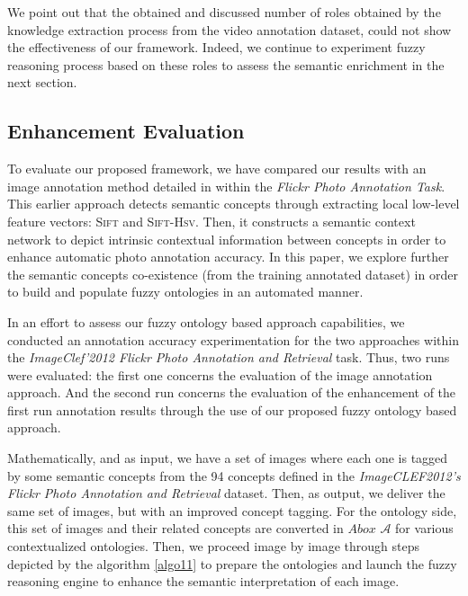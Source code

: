 		We point out that the obtained and discussed number of roles obtained by the knowledge
		extraction process from the video annotation dataset, could not show the effectiveness of our 
		framework. Indeed, we continue to experiment fuzzy reasoning process based 
		on these roles to assess the semantic enrichment in the next section.

		\subsection{Enhancement Evaluation}
		To evaluate our proposed framework, we have compared our results with an image annotation 
		method detailed in \cite{Ksibi2012} within the \emph{Flickr Photo Annotation Task}. 
		This earlier approach detects semantic concepts through extracting
		local low-level feature vectors: \textsc{Sift} and \textsc{Sift-Hsv}.
		Then, it constructs a semantic context network to depict intrinsic 
		contextual information between concepts in order to enhance automatic 
		photo annotation accuracy. In this paper, we explore further the semantic concepts 
		co-existence (from the training annotated dataset) in order to build and populate 
		fuzzy ontologies in an automated manner.
		
		In an effort to assess our fuzzy ontology based approach capabilities, 
		we conducted an annotation accuracy experimentation for the
		two approaches within the \emph{ImageClef'2012 Flickr Photo Annotation and
		Retrieval} task.
		Thus, two runs were evaluated: the first one concerns the evaluation of  
		the image annotation approach. And the second run concerns the evaluation 
		of the enhancement of the first run annotation results through the use of
		our proposed fuzzy ontology based approach.


		Mathematically, and as input, we have a set of images where each one is tagged by  some 
		semantic concepts from the 94 concepts defined in the \emph{ImageCLEF2012's Flickr Photo 
		Annotation and Retrieval} dataset. Then, as output, we deliver the same set of
		images, but with an improved concept tagging. For the ontology side, this set of images and their 
		related concepts are converted in $Abox$ $\mathcal{A}$ for various contextualized ontologies.
		Then, we proceed image by image through steps depicted by the algorithm \ref{algo11} 
		to prepare the ontologies and launch the fuzzy reasoning engine to enhance the 
		semantic interpretation of each image.

